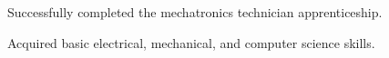\begin{tightemize}
    \item Successfully completed the mechatronics technician apprenticeship.  
    \item Acquired basic electrical, mechanical, and computer science skills.
\end{tightemize}